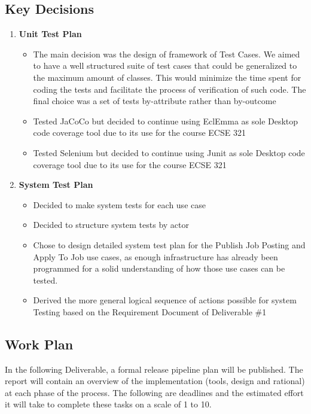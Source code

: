 \documentclass[12pt]{article}
\begin{document}
 \subsection{Key Decisions}
%
%
 \begin{enumerate}
    \item \textbf{Unit Test Plan}
    \begin{itemize}
     	\item The main decision was the design of framework of Test Cases. We aimed to have a well structured suite of test cases that could be generalized to the maximum amount of classes. This would minimize the time spent for coding the tests and facilitate the process of verification of such code. The final choice was a set of tests by-attribute rather than by-outcome
		\item Tested JaCoCo but decided to continue using EclEmma as sole Desktop code coverage tool due to its use for the course ECSE 321
		\item Tested Selenium but decided to continue using Junit as sole Desktop code coverage tool due to its use for the course ECSE 321
     \end{itemize}
     \item \textbf{System Test Plan}
     \begin{itemize}
     	\item Decided to make system tests for each use case
		\item Decided to structure system tests by actor
		\item Chose to design detailed system test plan for the Publish Job Posting and Apply To Job
			use cases, as enough infrastructure has already been programmed for a solid
			understanding of how those use cases can be tested.
		\item Derived the more general logical sequence of actions possible for system Testing based on the Requirement Document of Deliverable \#1
     \end{itemize}
 \end{enumerate}
%
 \subsection{Work Plan}
%
In the following Deliverable, a formal release pipeline plan will be published. The report will contain an overview of the implementation (tools, design and rational) at each phase of the process. The following are deadlines and the estimated effort it will take to complete these tasks on a scale of 1 to 10.
\end{document}
